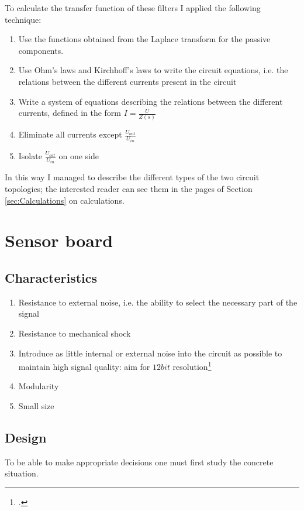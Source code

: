\documentclass[a4paper, 10pt, final]{article} %
\begin{document}
    \noindent To calculate the transfer function of these filters I applied the following technique:
    \begin{enumerate}[label=\emph{(\roman*)}]
        \item Use the functions obtained from the Laplace transform for the passive components.
        \item Use Ohm's laws and Kirchhoff's laws to write the circuit equations, i.e. the relations between the different currents present in the circuit
        \item Write a system of equations describing the relations between the different currents, defined in the form $I=\frac{U}{Z(s)}$
        \item Eliminate all currents except $\frac{U_{out}}{U_{in}}$
        \item Isolate $\frac{U_{out}}{U_{in}}$ on one side
    \end{enumerate}
    In this way I managed to describe the different types of the two circuit topologies; the interested reader can see them in the pages of Section \ref{sec:Calculations} on calculations.

    \clearpage
    \section{Sensor board}\label{sec:Sensorboard}
    \subsection{Characteristics}\label{sec:SensorboardCharacteristics}
    \begin{enumerate}[label=\emph{(\arabic*)}]
        \item Resistance to external noise, i.e. the ability to select the necessary part of the signal
        \item Resistance to mechanical shock
        \item Introduce as little internal or external noise into the circuit as possible to maintain high signal quality: aim for $12bit$ resolution\footcite[p9]{EMGBitdepth}
        \item Modularity
        \item Small size
    \end{enumerate}

    \subsection{Design}\label{sec:SensorboardDesign}
    To be able to make appropriate decisions one must first study the concrete situation.
\end{document}
